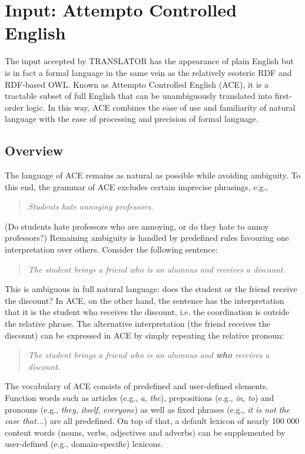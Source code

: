 \documentclass[12pt]{article}
\begin{document}
\section{Input: Attempto Controlled English}
The input accepted by TRANSLATOR has the appearance of plain English but is in fact a formal language in the same vein as the relatively esoteric RDF and RDF-based OWL. Known as Attempto Controlled English (ACE), it is a tractable subset of full English that can be unambiguously translated into first-order logic. In this way, ACE combines the ease of use and familiarity of natural language with the ease of processing and precision of formal language.

\subsection{Overview}

The language of ACE remains as natural as possible while avoiding ambiguity. To this end, the grammar of ACE excludes certain imprecise phrasings, e.g.,
\begin{quote}
\textit{Students hate annoying professors.}
\end{quote}
(Do students hate professors who are annoying, or do they hate to annoy professors?) Remaining ambiguity is handled by predefined rules favouring one interpretation over others. Consider the following sentence:
\begin{quote}
\textit{The student brings a friend who is an alumnus and receives a discount.}
\end{quote}
This is ambiguous in full natural language: does the student or the friend receive the discount? In ACE, on the other hand, the sentence has the interpretation that it is the student who receives the discount, i.e. the coordination is outside the relative phrase. The alternative interpretation (the friend receives the discount) can be expressed in ACE by simply repeating the relative pronoun:
\begin{quote}
\textit{The student brings a friend who is an alumnus and \textbf{who} receives a discount.}
\end{quote}
The vocabulary of ACE consists of predefined and user-defined elements. Function words such as articles (e.g., \textit{a}, \textit{the}), prepositions (e.g., \textit{in}, \textit{to}) and pronouns (e.g., \textit{they}, \textit{itself}, \textit{everyone}) as well as fixed phrases (e.g., \textit{it is not the case that...}) are all predefined. On top of that, a default lexicon of nearly 100 000 content words (nouns, verbs, adjectives and adverbs) can be supplemented by user-defined (e.g., domain-specific) lexicons.
\end{document}
